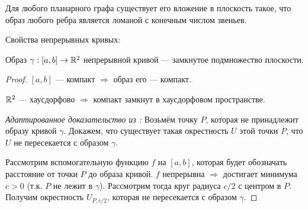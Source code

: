 \begin{theorem}[$\bigstar$]
    Для любого планарного графа существует его вложение в плоскость такое, что образ любого ребра является ломаной с конечным числом звеньев.
\end{theorem}

Свойства непрерывных кривых:

\begin{lemma}
    Образ $\gamma: [a,b] \to \mathbb{R}^2$ непрерывной кривой — замкнутое подмножество плоскости.
\end{lemma}
\begin{proof}
    $\left[a,b\right]$ — компакт $\Longrightarrow$ образ его — компакт.
    
    $\mathbb{R}^2$ — хаусдорфово $\Longrightarrow$ компакт замкнут в хаусдорфовом пространстве.

    \noindent \textit{Адаптированное доказательство из \cite{oshemkov}:} Возьмём точку $P$, которая не принадлежит образу кривой $\gamma$. Докажем, что существует такая окрестность $U$ этой точки $P$, что $U$ не пересекается с образом $\gamma$.

    Рассмотрим вспомогательную функцию $f$ на $[a,b]$, которая будет обозначать расстояние от точки $P$ до образа кривой. $f$ непрерывна $\Longrightarrow$ достигает минимума $c > 0$ (т.к. $P$ не лежит в $\gamma$). Рассмотрим тогда круг радиуса $c / 2$ с центром в $P$. Получим окрестность $U_{P, c/2}$, которая не пересекается с образом $\gamma$.
\end{proof}



